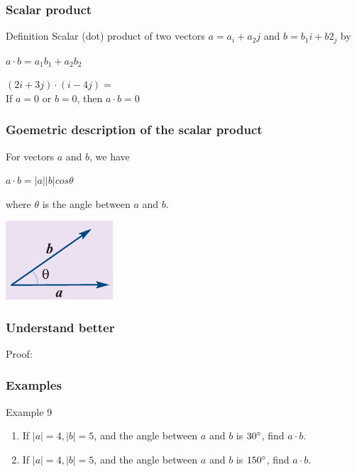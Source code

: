 \documentclass[
	11pt, %
]{beamer}
\begin{document}
\begin{frame}
    \frametitle{Scalar product}
    \begin{block}{Definition}
        Scalar (dot) product of two vectors $a = a_i + a_2j$ and $b = b_1i + b2_j$ by\\
    \begin{center}
        $a \cdot b = a_1b_1 + a_2b_2$
    \end{center}
    \end{block}
    $(2i + 3j)\cdot (i-4j) = $\\
    If $a = 0$ or $b = 0$, then $a \cdot b = 0$
\end{frame}

\begin{frame}
    \frametitle{Goemetric description of the scalar product}
    For vectors $a$ and $b$, we have\\
    \begin{center}
        $a \cdot b = |a||b|cos\theta$\\
    \end{center}
    where $\theta$ is the angle between $a$ and $b$.
    \begin{center}
        \includegraphics[width = 4cm]{dot_product.png}
    \end{center}
\end{frame}

\begin{frame}[t]
    \frametitle{Understand better}
    Proof:
\end{frame}

\begin{frame}[t]
    \frametitle{Examples}
    \begin{block}{Example 9}
        \begin{enumerate}
            \item If $|a| = 4, |b| = 5$, and the angle between $a$ and $b$ is $30\degree$, find $a\cdot b$.
            \item If $|a| = 4, |b| = 5$, and the angle between $a$ and $b$ is $150\degree$, find $a\cdot b$.
        \end{enumerate}
    \end{block}
\end{frame}
\end{document}
